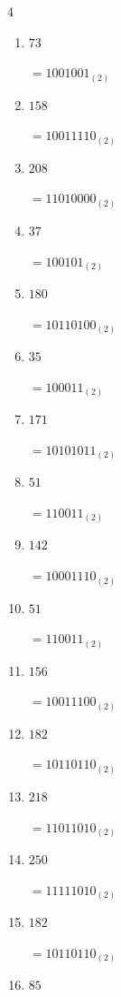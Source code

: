 \begin{multicols}{4}
\begin{enumerate}
        $=11011101_{(2)}$

  \item $73$

        $=1001001_{(2)}$

  \item $158$

        $=10011110_{(2)}$

\columnbreak %

  \item $208$

        $=11010000_{(2)}$

  \item $37$

        $=100101_{(2)}$

  \item $180$

        $=10110100_{(2)}$

  \item $35$

        $=100011_{(2)}$

  \item $171$

        $=10101011_{(2)}$

  \item $51$

        $=110011_{(2)}$

  \item $142$

        $=10001110_{(2)}$

  \item $51$

        $=110011_{(2)}$

  \item $156$

        $=10011100_{(2)}$

  \item $182$

        $=10110110_{(2)}$

  \item $218$

        $=11011010_{(2)}$

  \item $250$

        $=11111010_{(2)}$

  \item $182$

        $=10110110_{(2)}$

  \item $85$


\end{enumerate}
\end{multicols}
